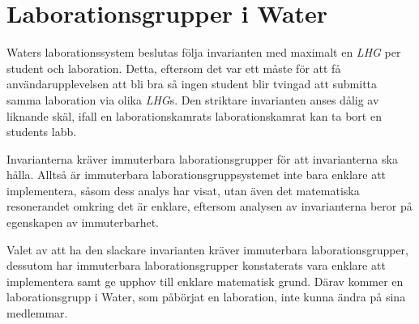 \section{Laborationsgrupper i Water}

Waters laborationssystem beslutas följa invarianten med maximalt en \emph{LHG} per student
och laboration. Detta, eftersom det var ett måste för att få användarupplevelsen
att bli bra så ingen student blir tvingad att submitta samma laboration via olika
\emph{LHG}s. Den striktare invarianten anses dålig av liknande skäl, ifall en 
laborationskamrats laborationskamrat kan ta bort en students labb.

Invarianterna kräver immuterbara laborationsgrupper för att invarianterna ska
hålla. Alltså är immuterbara laborationsgruppsystemet inte bara enklare att
implementera, såsom dess analys har visat, utan även det matematiska
resonerandet omkring det är enklare, eftersom analysen av invarianterna beror
på egenskapen av immuterbarhet.

Valet av att ha den slackare invarianten kräver immuterbara laborationsgrupper,
dessutom har immuterbara laborationsgrupper konstaterats vara enklare att implementera
samt ge upphov till enklare matematisk grund. Därav kommer en laborationsgrupp
i Water, som påbörjat en laboration, inte kunna ändra på sina medlemmar.
